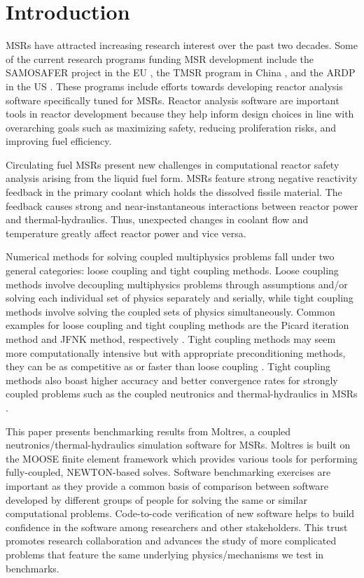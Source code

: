 \section{Introduction}

\glspl{MSR} have attracted increasing research interest over the past two
decades. Some of the
current research programs funding \gls{MSR} development include the
\gls{SAMOSAFER} project in the EU \cite{cordis_severe_nodate}, the TMSR
program in China \cite{dai_17_2017}, and the \gls{ARDP} in the US
\cite{office_of_nuclear_energy_advanced_nodate}. These programs include
efforts towards developing
reactor analysis software specifically tuned for \glspl{MSR}. Reactor
analysis software are important tools in reactor development because
they help inform design choices in line with overarching goals such as
maximizing safety, reducing proliferation risks, and improving fuel
efficiency.

Circulating fuel \glspl{MSR} present new challenges in computational reactor
safety analysis arising from the liquid fuel form. \glspl{MSR} feature strong
negative reactivity feedback in the primary coolant which holds the dissolved
fissile material. The feedback causes strong and near-instantaneous
interactions between reactor power and thermal-hydraulics. Thus,
unexpected changes in coolant flow and temperature greatly affect reactor
power and vice versa.

Numerical methods for solving coupled multiphysics problems fall under two
general categories: loose coupling and tight coupling methods. Loose coupling
methods involve decoupling multiphysics problems through assumptions and/or
solving each individual set of physics separately and serially, while tight
coupling methods involve solving the coupled sets of physics simultaneously.
Common examples for loose coupling and tight coupling methods are the
Picard iteration method and \gls{JFNK} method, respectively
\cite{wang_review_2020}. Tight coupling methods may seem more computationally
intensive but with appropriate preconditioning methods, they can be as
competitive as or faster than loose coupling \cite{wang_review_2020}.
Tight coupling methods also boast higher accuracy and better convergence rates
for strongly coupled problems such as the coupled neutronics and
thermal-hydraulics in \glspl{MSR} \cite{lindsay_introduction_2018}.

This paper presents benchmarking results from Moltres, a coupled
neutronics/thermal-hydraulics simulation software for \glspl{MSR}. Moltres is
built on the \gls{MOOSE} \cite{gaston_physics-based_2015} finite element
framework which provides various tools for performing fully-coupled,
NEWTON-based solves. Software benchmarking exercises are important as they
provide a common basis of comparison between software developed by different
groups of people for solving the same or similar computational problems.
Code-to-code verification of new software helps to build confidence in the
software among researchers and other stakeholders. This trust promotes
research collaboration and advances the study of more complicated problems that
feature the same underlying physics/mechanisms we test in benchmarks.
